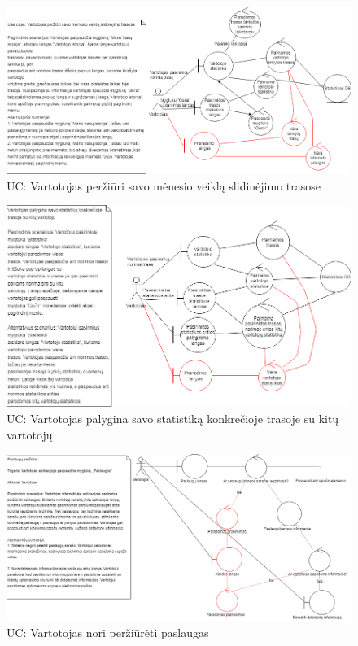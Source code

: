 \documentclass[oneside]{VUMIFPSkursinis}
\begin{document}
\begin{figure}[h]
    \centering
    \includegraphics[width=1.0\textwidth]{rob2.png}
    \caption{UC: Vartotojas peržiūri savo mėnesio veiklą slidinėjimo trasose}
    \label{fig:rob2}
\end{figure}

\begin{figure}[h]
    \centering
    \includegraphics[width=1.0\textwidth]{rob3.png}
    \caption{UC: Vartotojas palygina savo statistiką konkrečioje trasoje su kitų vartotojų}
    \label{fig:rob3}
\end{figure}
\vskip 1cm

\begin{figure}[h]
    \centering
    \includegraphics[width=1.0\textwidth]{Rob4.png}
    \caption{UC: Vartotojas nori peržiūrėti paslaugas}
    \label{fig:rob4}
\end{figure}
\vskip 1cm
\end{document}

